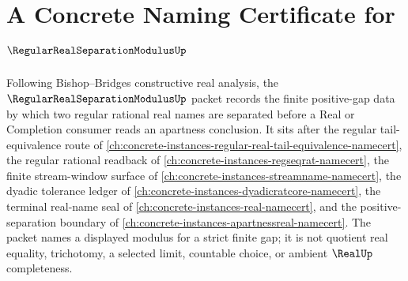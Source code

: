 \chapter{A Concrete Naming Certificate for $\RegularRealSeparationModulusUp$}
\label{ch:concrete-instances-regular-real-separation-modulus-namecert}

Following Bishop--Bridges constructive real analysis, the $\RegularRealSeparationModulusUp$ packet records the finite positive-gap data by which two regular rational real names are separated before a Real or Completion consumer reads an apartness conclusion. It sits after the regular tail-equivalence route of \autoref{ch:concrete-instances-regular-real-tail-equivalence-namecert}, the regular rational readback of \autoref{ch:concrete-instances-regseqrat-namecert}, the finite stream-window surface of \autoref{ch:concrete-instances-streamname-namecert}, the dyadic tolerance ledger of \autoref{ch:concrete-instances-dyadicratcore-namecert}, the terminal real-name seal of \autoref{ch:concrete-instances-real-namecert}, and the positive-separation boundary of \autoref{ch:concrete-instances-apartnessreal-namecert}. The packet names a displayed modulus for a strict finite gap; it is not quotient real equality, trichotomy, a selected limit, countable choice, or ambient $\RealUp$ completeness.

